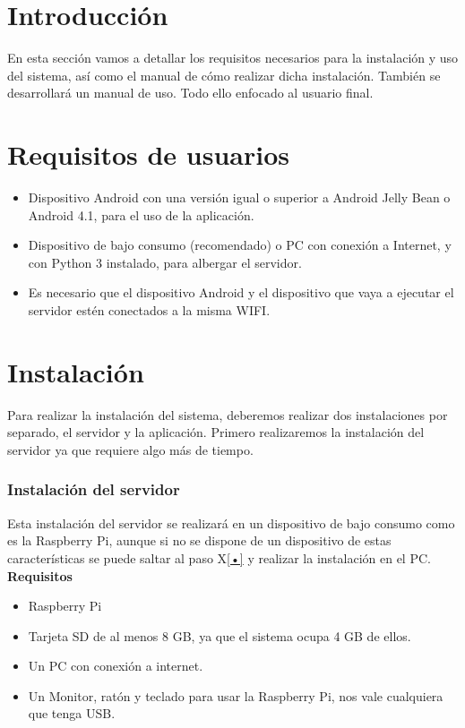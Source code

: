 
\section{Introducción}

En esta sección vamos a detallar los requisitos necesarios para la instalación y uso del sistema, así como el manual de cómo realizar dicha instalación. También se desarrollará un manual de uso. Todo ello enfocado al usuario final.

\section{Requisitos de usuarios}

\begin{itemize}
\item
	Dispositivo Android con una versión igual o superior a Android Jelly Bean o Android 4.1, para el uso de la aplicación.
\item
	Dispositivo de bajo consumo (recomendado) o PC con conexión a Internet, y con Python 3 instalado, para albergar el servidor.
\item
	Es necesario que el dispositivo Android y el dispositivo que vaya a ejecutar el servidor estén conectados a la misma WIFI.
\end{itemize}

\section{Instalación}

Para realizar la instalación del sistema, deberemos realizar dos instalaciones por separado, el servidor y la aplicación. Primero realizaremos la instalación del servidor ya que requiere algo más de tiempo.

\subsubsection{Instalación del servidor}

Esta instalación del servidor se realizará en un dispositivo de bajo consumo como es la Raspberry Pi, aunque si no se dispone de un dispositivo de estas características se puede saltar al paso X\ref{•} y realizar la instalación en el PC.\\

\textbf{Requisitos}

\begin{itemize}
\item
	Raspberry Pi
\item
	Tarjeta SD de al menos 8 GB, ya que el sistema ocupa 4 GB de ellos.
\item
	Un PC con conexión a internet.
\item \label{piperifs}
	Un Monitor, ratón y teclado para usar la Raspberry Pi, nos vale cualquiera que tenga USB.
\end{itemize}

